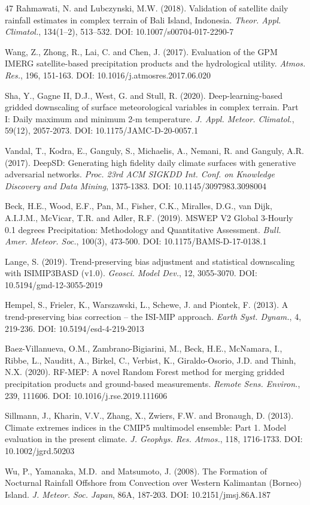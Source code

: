 \documentclass[11pt,a4paper]{article}
\begin{document}
{\begin{thebibliography}{47}
 Rahmawati, N. and Lubczynski, M.W. (2018). Validation of
satellite daily rainfall estimates in complex terrain of Bali Island,
Indonesia. \emph{Theor. Appl. Climatol.}, 134(1--2), 513--532. DOI:
10.1007/s00704-017-2290-7

 Wang, Z., Zhong, R., Lai, C. and Chen, J. (2017). Evaluation of
the GPM IMERG satellite-based precipitation products and the
hydrological utility. \emph{Atmos. Res.}, 196, 151-163. DOI:
10.1016/j.atmosres.2017.06.020

 Sha, Y., Gagne II, D.J., West, G. and Stull, R. (2020).
Deep-learning-based gridded downscaling of surface meteorological
variables in complex terrain. Part I: Daily maximum and minimum 2-m
temperature. \emph{J. Appl. Meteor. Climatol.}, 59(12), 2057-2073. DOI:
10.1175/JAMC-D-20-0057.1

 Vandal, T., Kodra, E., Ganguly, S., Michaelis, A., Nemani, R.
and Ganguly, A.R. (2017). DeepSD: Generating high fidelity daily climate
surfaces with generative adversarial networks. \emph{Proc. 23rd ACM
SIGKDD Int. Conf. on Knowledge Discovery and Data Mining}, 1375-1383.
DOI: 10.1145/3097983.3098004

 Beck, H.E., Wood, E.F., Pan, M., Fisher, C.K., Miralles, D.G.,
van Dijk, A.I.J.M., McVicar, T.R. and Adler, R.F. (2019). MSWEP V2
Global 3-Hourly 0.1 degrees Precipitation: Methodology and Quantitative
Assessment. \emph{Bull. Amer. Meteor. Soc.}, 100(3), 473-500. DOI:
10.1175/BAMS-D-17-0138.1

 Lange, S. (2019). Trend-preserving bias adjustment and
statistical downscaling with ISIMIP3BASD (v1.0). \emph{Geosci. Model
Dev.}, 12, 3055-3070. DOI: 10.5194/gmd-12-3055-2019

 Hempel, S., Frieler, K., Warszawski, L., Schewe, J. and
Piontek, F. (2013). A trend-preserving bias correction -- the ISI-MIP
approach. \emph{Earth Syst. Dynam.}, 4, 219-236. DOI:
10.5194/esd-4-219-2013

 Baez-Villanueva, O.M., Zambrano-Bigiarini, M., Beck, H.E.,
McNamara, I., Ribbe, L., Nauditt, A., Birkel, C., Verbist, K.,
Giraldo-Osorio, J.D. and Thinh, N.X. (2020). RF-MEP: A novel Random
Forest method for merging gridded precipitation products and
ground-based measurements. \emph{Remote Sens. Environ.}, 239, 111606.
DOI: 10.1016/j.rse.2019.111606

 Sillmann, J., Kharin, V.V., Zhang, X., Zwiers, F.W. and
Bronaugh, D. (2013). Climate extremes indices in the CMIP5 multimodel
ensemble: Part 1. Model evaluation in the present climate. \emph{J.
Geophys. Res. Atmos.}, 118, 1716-1733. DOI: 10.1002/jgrd.50203

 Wu, P., Yamanaka, M.D.~and Matsumoto, J. (2008). The Formation
of Nocturnal Rainfall Offshore from Convection over Western Kalimantan
(Borneo) Island. \emph{J. Meteor. Soc. Japan}, 86A, 187-203. DOI:
10.2151/jmsj.86A.187

\end{thebibliography}
}
\end{document}
